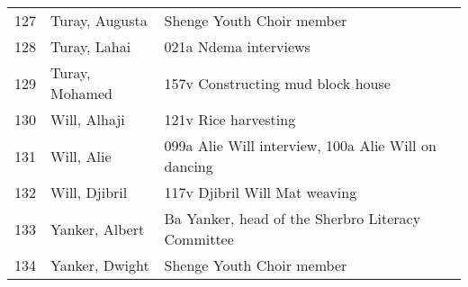\begin{xltabular}{\textwidth}{llQ}
 127 & Turay, Augusta & Shenge Youth Choir member\\
 128 & Turay, Lahai & 021a Ndema interviews\\
 129 & Turay, Mohamed & 157v Constructing mud block house\\
 130 & Will, Alhaji & 121v Rice harvesting\\
 131 & Will, Alie & 099a Alie Will interview, 100a Alie Will on dancing\\
 132 & Will, Djibril & 117v Djibril Will Mat weaving\\
 133 & Yanker, Albert & Ba Yanker, head of the Sherbro Literacy Committee\\
 134 & Yanker, Dwight & Shenge Youth Choir member\\
\end{xltabular}

